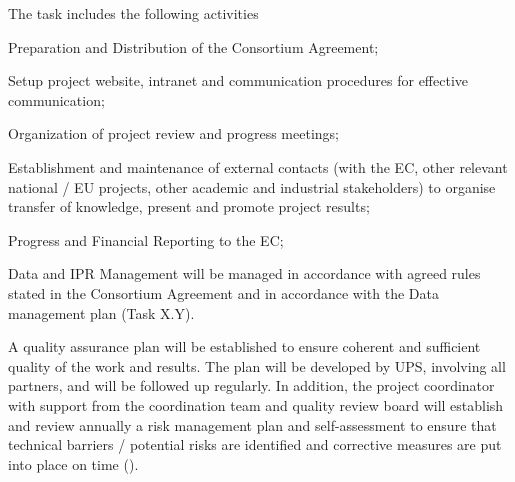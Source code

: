 \begin{workpackage}
\begin{tasklist}
\begin{task}[title=Project and financial management,
  id=project-finance-management,lead=PS,PM=33,wphases={0-3,10-12,22-24,34-36,42-48,0-48!.2},
  partners={LL,UV,UJF,UB,UO,USH,USO,SA,UW,JU,UK,US,ZH,SR}]
The task includes the following activities
  \begin{compactitem}
  \item Preparation and Distribution of the
    Consortium Agreement;
  \item Setup project website, intranet and
    communication procedures for effective communication;
  \item
    Organization of project review and progress meetings;
  \item
    Establishment and maintenance of external contacts (with the EC,
    other relevant national / EU projects, other academic and
    industrial stakeholders) to organise transfer of knowledge,
    present and
promote project results;
  \item Progress and Financial Reporting to the EC;
  \item Data and IPR Management will be managed in accordance with agreed rules stated in the
Consortium Agreement and in accordance with the Data management plan (Task X.Y).
  \end{compactitem}
\end{task}

\begin{task}[title=Quality assurance and risk management,id=project-quality-management,
  wphases=6-48!.3,
  lead=PS,PM=15,partners={LL,UV,UJF,UB,UO,USH,USO,SA,UW,JU,UK,US,ZH,SR}]
A quality assurance plan will be established to ensure coherent and sufficient quality of the work
and results. The plan will be developed by UPS, involving all partners, and will be followed up
regularly. In addition, the project coordinator with support from the coordination team and quality review board will establish and review annually a risk management plan and self-assessment to ensure that technical barriers / potential risks are identified  and corrective measures are put into place on time ().
\end{task}


\end{tasklist}
\end{workpackage}
